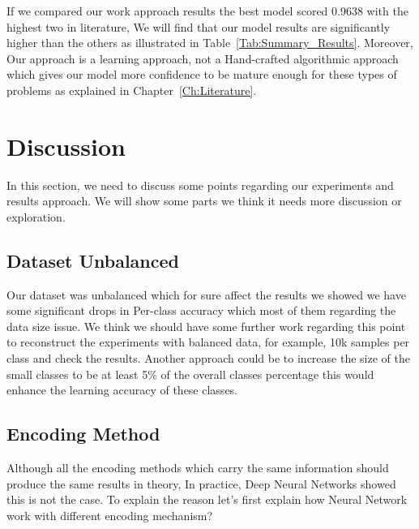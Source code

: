 If we compared our work approach results the best model scored 0.9638 with the highest two in literature, We will find that our model results are significantly higher than the others as illustrated in Table~\ref{Tab:Summary_Results}. Moreover, Our approach is a learning approach, not a Hand-crafted algorithmic approach which gives our model more confidence to be mature enough for these types of problems as explained in Chapter~\ref{Ch:Literature}.

\section{Discussion}\label{Sec:Discussion}

In this section, we need to discuss some points regarding our experiments and results approach. We will show some parts we think it needs more discussion or exploration.


\subsection{Dataset Unbalanced}

Our dataset was unbalanced which for sure affect the results we showed we have some significant drops in Per-class accuracy which most of them regarding the data size issue. We think we should have some further work regarding this point to reconstruct the experiments with balanced data, for example, 10k samples per class and check the results. Another approach could be to increase the size of the small classes to be at least 5\% of the overall classes percentage this would enhance the learning accuracy of these classes.  
\subsection{Encoding Method}

Although all the encoding methods which carry the same information should produce the same results in theory, In practice, Deep Neural Networks showed this is not the case. To explain the reason let’s first explain how Neural Network work with different encoding mechanism?

